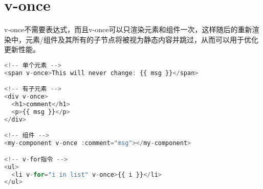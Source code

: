 \begin{lstlisting}[language=JavaScript]

\end{lstlisting}




\begin{lstlisting}[language=JavaScript]

\end{lstlisting}




\begin{lstlisting}[language=JavaScript]

\end{lstlisting}




\begin{lstlisting}[language=JavaScript]

\end{lstlisting}




\begin{lstlisting}[language=JavaScript]

\end{lstlisting}




\begin{lstlisting}[language=JavaScript]

\end{lstlisting}




\begin{lstlisting}[language=JavaScript]

\end{lstlisting}

\chapter{v-once}

v-once不需要表达式，而且v-once可以只渲染元素和组件一次，这样随后的重新渲染中，元素/组件及其所有的子节点将被视为静态内容并跳过，从而可以用于优化更新性能。


\begin{lstlisting}[language=JavaScript]
<!-- 单个元素 -->
<span v-once>This will never change: {{ msg }}</span>

<!-- 有子元素 -->
<div v-once>
  <h1>comment</h1>
  <p>{{ msg }}</p>
</div>

<!-- 组件 -->
<my-component v-once :comment="msg"></my-component>

<!-- v-for指令 -->
<ul>
  <li v-for="i in list" v-once>{{ i }}</li>
</ul>
\end{lstlisting}



